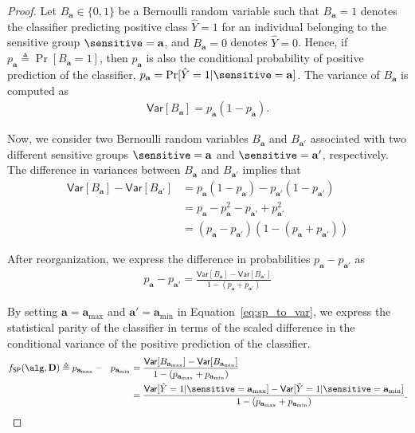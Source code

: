 \begin{proof}

Let $ B_{\mathbf{a}} \in \{0, 1\} $ be a Bernoulli random variable such that $ B_{\mathbf{a}} = 1 $ denotes the classifier predicting positive class $ \hat{Y} = 1 $ for an individual belonging to the sensitive group $ \sensitive = \mathbf{a} $, and $ B_{\mathbf{a}} = 0 $ denotes $ \hat{Y} = 0 $. Hence, if $ p_\mathbf{a} \triangleq \Pr[B_\mathbf{a} = 1] $, then $ p_\mathbf{a} $ is also the conditional probability of positive prediction of the classifier,  $ p_\mathbf{a} = \Pr[\hat{Y} = 1 |  \sensitive = \mathbf{a}] $. The variance of $ B_{\mathbf{a}} $ is computed as
\begin{align*}
	\mathsf{Var}[B_\mathbf{a}] = p_{\mathbf{a}}(1 - p_{\mathbf{a}}). 
\end{align*}

Now, we consider two Bernoulli random variables $ B_\mathbf{a} $ and $ B_\mathbf{a'} $ associated with two different sensitive groups $ \sensitive = \mathbf{a} $ and $ \sensitive = \mathbf{a}' $, respectively. The difference in variances between $ B_\mathbf{a} $ and $ B_\mathbf{a'} $ implies that
\begin{align*}
	\mathsf{Var}[B_\mathbf{a}] - \mathsf{Var}[B_\mathbf{a'}] &= p_{\mathbf{a}}(1 - p_{\mathbf{a}}) - p_{\mathbf{a'}}(1 - p_{\mathbf{a'}}) \\
	&= p_{\mathbf{a}} - p_{\mathbf{a}}^2 - p_{\mathbf{a'}} + p_{\mathbf{a'}}^2 \\ 
	&= (p_\mathbf{a} -  p_\mathbf{a'}) (1 - (p_\mathbf{a} + p_\mathbf{a'}))
\end{align*}

After reorganization, we express the difference in probabilities $ p_\mathbf{a} -  p_\mathbf{a'} $ as
\begin{align}
	\label{eq:sp_to_var}
	p_\mathbf{a} -  p_\mathbf{a'}  = \frac{	\mathsf{Var}[B_\mathbf{a}] - \mathsf{Var}[B_\mathbf{a'}]}{1 - (p_\mathbf{a} + p_\mathbf{a'})}
\end{align}




By setting $ \mathbf{a} = \mathbf{a}_{\max} $ and $ \mathbf{a'} = \mathbf{a}_{\min} $ in Equation~\eqref{eq:sp_to_var}, we express the statistical parity of the classifier in terms of the scaled difference in the conditional variance of the positive prediction of the classifier. 
\begin{align}
	f_{\mathsf{SP}}(\alg, \mathbf{D}) \triangleq p_{\mathbf{a}_{\max}} -  ~~p_{\mathbf{a}_{\min}}  &= \frac{	\mathsf{Var}[B_{\mathbf{a}_{\max}}] - \mathsf{Var}[B_{\mathbf{a}_{\min}}]}{1 - (p_{\mathbf{a}_{\max}} + p_{\mathbf{a}_{\min}})}\label{eq:sp_var_diff}\\
	&= \frac{	\mathsf{Var}[\hat{Y} = 1| \sensitive = \mathbf{a}_{\max}] - \mathsf{Var}[\hat{Y} = 1| \sensitive = \mathbf{a}_{\min}]}{1 - (p_{\mathbf{a}_{\max}} + p_{\mathbf{a}_{\min}})} \notag.
\end{align}


\end{proof}
